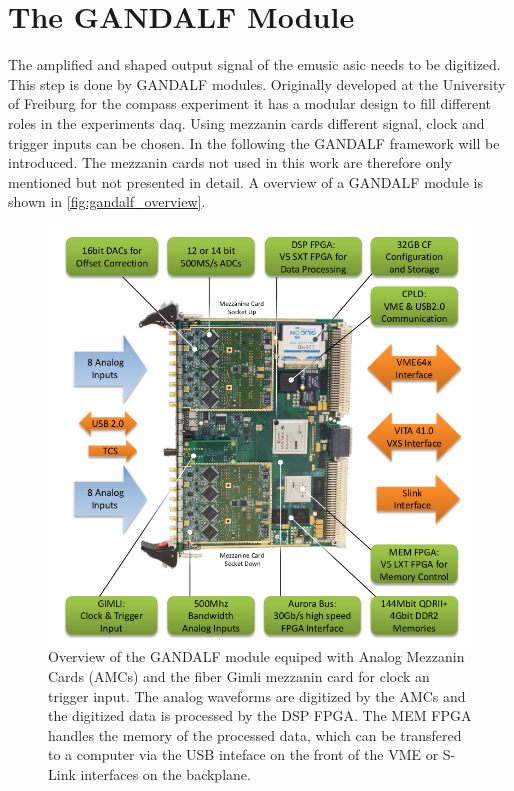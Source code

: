 \section{The GANDALF Module}
The amplified and shaped output signal of the \ac{emusic} \ac{asic} needs to be digitized.
This step is done by GANDALF modules.
Originally developed at the University of Freiburg for the \ac{compass} experiment it has a modular design to fill different roles in the experiments \ac{daq}.
Using mezzanin cards different signal, clock and trigger inputs can be chosen.
In the following the GANDALF framework will be introduced.
The mezzanin cards not used in this work are therefore only mentioned but not presented in detail.
A overview of a GANDALF module is shown in \autoref{fig:gandalf_overview}.
\begin{figure}
	\centering
	\includegraphics[width=1.\linewidth]{pictures/gandalf_overview.png}
	\caption[Overview of the GANDALF module]{Overview of the GANDALF module equiped with Analog Mezzanin Cards (AMCs) and the fiber Gimli mezzanin card for clock an trigger input. The analog waveforms are digitized by the AMCs and the digitized data is processed by the DSP FPGA. The MEM FPGA handles the memory of the processed data, which can be transfered to a computer via the USB inteface on the front of the VME or S-Link interfaces on the backplane. \cite{herrmann}}
	\label{fig:gandalf_overview}
\end{figure}

